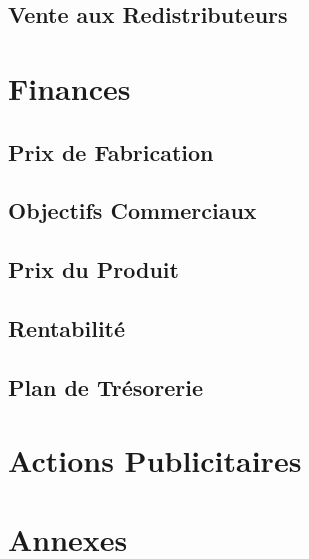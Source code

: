 \documentclass[10pt,a4paper]{article}
\begin{document}
\subsection{Vente aux Redistributeurs}
\section{Finances}
\subsection{Prix de Fabrication}
\subsection{Objectifs Commerciaux}
\subsection{Prix du Produit}
\subsection{Rentabilité}
\subsection{Plan de Trésorerie}
\section{Actions Publicitaires}
\section{Annexes}
\end{document}
